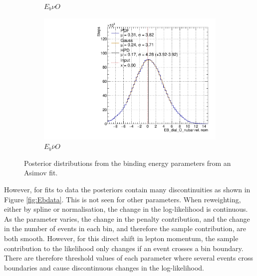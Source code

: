 \begin{figure}[t]
\begin{subfigure}{.48\textwidth}
  \caption{$E_{b}\nu O$}
\end{subfigure}
\begin{subfigure}{.48\textwidth}
  \centering
  \includegraphics[width=0.73\linewidth]{figs/EB_dial_O_nubarAsmv}
  \caption{$E_{b}\bar{\nu}O$}
\end{subfigure}
\caption{Posterior distributions from the binding energy parameters from an Asimov fit.}
\label{fig:Ebasimov}
\end{figure}

However, for fits to data the posteriors contain many discontinuities as shown in Figure \ref{fig:Ebdata}. This is not seen for other parameters. When reweighting, either by spline or normalisation, the change in the log-likelihood is continuous. As the parameter varies, the change in the penalty contribution, and the change in the number of events in each bin, and therefore the sample contribution, are both smooth. However, for this direct shift in lepton momentum, the sample contribution to the likelihood only changes if an event crosses a bin boundary. There are therefore threshold values of each parameter where several events cross boundaries and cause discontinuous changes in the log-likelihood.

